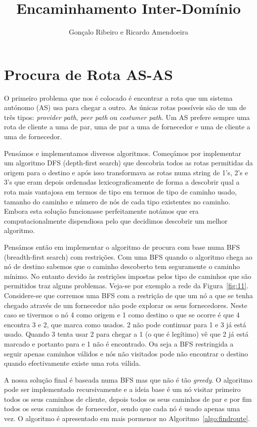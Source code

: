 \documentclass[10pt,a4paper]{article}
\author{Gonçalo Ribeiro e Ricardo Amendoeira}
\title{Encaminhamento Inter-Domínio}
\begin{document}

\pagebreak

\section{Procura de Rota AS-AS}
O primeiro problema que nos é colocado é encontrar a rota que um sistema autónomo (AS) usa para chegar a outro. As únicas rotas possíveis são de um de três tipos: \textit{provider path}, \textit{peer path} ou \textit{costumer path}. Um AS prefere sempre uma rota de cliente a uma de par, uma de par a uma de fornecedor e uma de cliente a uma de fornecedor.

Pensámos e implementamos diversos algoritmos. Começámos por implementar um algoritmo DFS (depth-first search) que descobria todos as rotas permitidas da origem para o destino e após isso transformava as rotas numa string de 1's, 2's e 3's que eram depois ordenadas lexicograficamente de forma a descobrir qual a rota mais vantajosa em termos de tipo em termos de tipo de caminho usado, tamanho do caminho e número de nós de cada tipo existentes no caminho. Embora esta solução funcionasse perfeitamente notámos que era computacionalmente dispendiosa pelo que decidimos descobrir um melhor algoritmo.

Pensámos então em implementar o algoritmo de procura com base numa BFS (breadth-first search) com restrições. Com uma BFS quando o algoritmo chega ao nó de destino sabemos que o caminho descoberto tem seguramente o caminho mínimo. No entanto devido às restrições impostas pelos tipo de caminhos que são permitidos traz alguns problemas. Veja-se por exemplo a rede da Figura~\ref{fig:11}. Considere-se que corremos uma BFS com a restrição de que um nó a que se tenha chegado através de um fornecedor não pode explorar os seus fornecedores. Neste caso se tivermos o nó 4 como origem e 1 como destino o que se ocorre é que 4 encontra 3 e 2, que marca como usados. 2 não pode continuar para 1 e 3 já está usado. Quando 3 tenta usar 2 para chegar a 1 (o que é legítimo) vê que 2 já está marcado e portanto para e 1 não é encontrado. Ou seja a BFS restringida a seguir apenas caminhos válidos e nós não visitados pode não encontrar o destino quando efectivamente existe uma rota válida.

A nossa solução final é baseada numa BFS mas que não é tão \textit{greedy}. O algoritmo pode ser implementado recursivamente e a ideia base é um nó visitar primeiro todos os seus caminhos de cliente, depois todos os seus caminhos de par e por fim todos os seus caminhos de fornecedor, sendo que cada nó é usado apenas uma vez. O algoritmo é apresentado em mais pormenor no Algoritmo~\ref{algo:findroute}.
\end{document}

